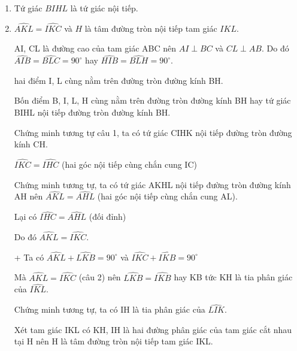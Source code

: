 \begin{ex}
{\begin{center}
		\end{center}
			\begin{enumerate}
			\item Tứ giác $BIHL$ là tứ giác nội tiếp.
			
			
			\item $\widehat{AKL} = \widehat{IKC}$ và $H$ là tâm đường tròn nội tiếp tam giác $IKL$.
			
			AI, CL là đường cao của tam giác ABC nên $AI \perp BC$ và $CL \perp AB$. Do đó
			$\widehat{AIB} = \widehat{BLC} = 90^\circ$ hay $\widehat{HIB} = \widehat{BLH} = 90^\circ$.
			
			hai điểm I, L cùng nằm trên đường tròn đường kính BH.
			
			Bốn điểm B, I, L, H cùng nằm trên đường tròn đường kính BH hay tứ giác BIHL nội tiếp đường tròn đường kính BH.
			
			Chứng minh tương tự câu 1, ta có tứ giác CIHK nội tiếp đường tròn đường kính CH.
			
			$\widehat{IKC} = \widehat{IHC}$ (hai góc nội tiếp cùng chắn cung IC)
			
			Chứng minh tương tự, ta có tứ giác AKHL nội tiếp đường tròn đường kính AH nên
			$\widehat{AKL} = \widehat{AHL}$ (hai góc nội tiếp cùng chắn cung AL).
			
			Lại có $\widehat{IHC} = \widehat{AHL}$ (đối đỉnh)
			
			Do đó $\widehat{AKL} = \widehat{IKC}$.
			
			+ Ta có $\widehat{AKL} + \widehat{LKB} = 90^\circ$ và $\widehat{IKC} + \widehat{IKB} = 90^\circ$
			
			Mà $\widehat{AKL} = \widehat{IKC}$ (câu 2) nên $\widehat{LKB} = \widehat{IKB}$ hay KB tức KH là tia phân giác của $\widehat{IKL}$.
			
			Chứng minh tương tự, ta có IH là tia phân giác của $\widehat{LIK}$.
			
			Xét tam giác IKL có KH, IH là hai đường phân giác của tam giác cắt nhau tại H nên H là tâm đường tròn nội tiếp tam giác IKL.
			
		\end{enumerate}
		}
\end{ex}